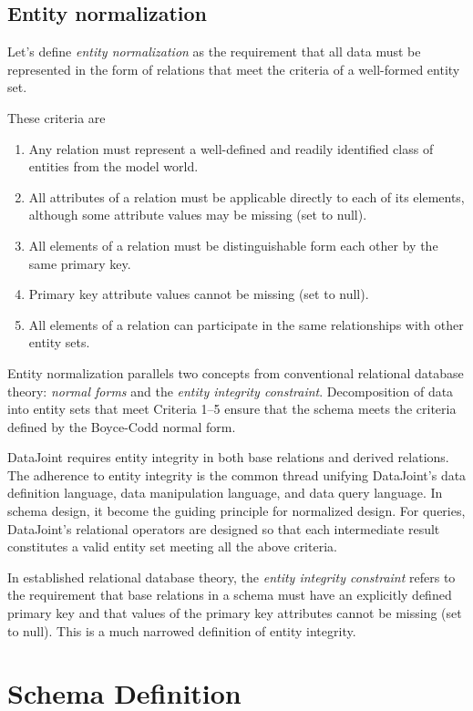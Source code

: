 \documentclass[letter,10pt]{article}
\newcommand{\datajoint}{DataJoint\xspace}
\begin{document}
\subsection{Entity normalization}\label{sec:norm}
Let's define \emph{entity normalization} as the requirement that all data must be represented in the form of relations that meet the criteria of a well-formed entity set.

These criteria are
\begin{enumerate}
\item Any relation must represent a well-defined and readily identified class of entities from the model world.
\item All attributes of a relation must be applicable directly to each of its elements, although some attribute values may be missing (set to null).  
\item All elements of a relation must be distinguishable form each other by the same primary key.
\item Primary key attribute values cannot be missing (set to null).
\item All elements of a relation can participate in the same relationships with other entity sets.
\end{enumerate}

Entity normalization parallels two concepts from conventional relational database theory: \emph{normal forms} and the \emph{entity integrity constraint}.
Decomposition  of data into entity sets that meet Criteria 1--5 ensure that the schema meets the criteria defined by the Boyce-Codd normal form.
 


\datajoint requires  entity integrity in both base relations and derived relations.  
The adherence to entity integrity is the common thread unifying \datajoint's data definition language, data manipulation language, and data query language. 
In schema design, it become the guiding principle for normalized design.
For queries, \datajoint's relational operators are designed so that each intermediate result constitutes a valid entity set meeting all the above criteria.

In established relational database theory, the \emph{entity integrity constraint} refers to the requirement that base relations in a schema  must have an explicitly defined primary key and that values of the primary key attributes cannot be missing (set to null).  
This is a much narrowed definition of entity integrity.

\section{Schema Definition}\label{sec:def1}
\end{document}
